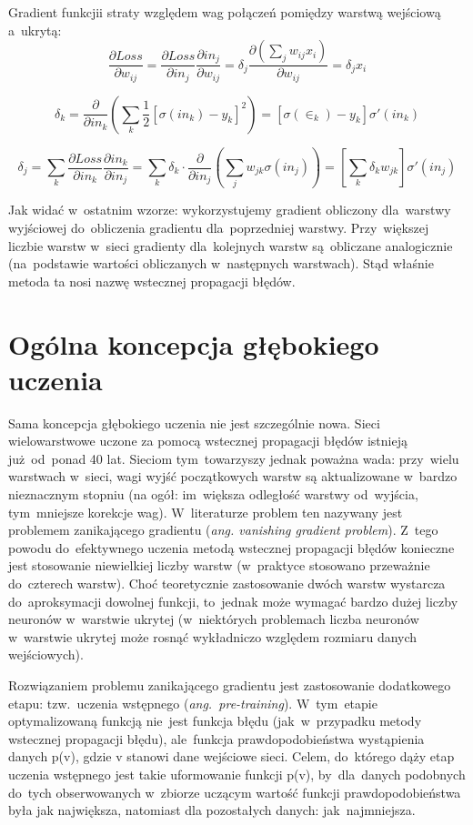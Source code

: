 Gradient funkcjii straty względem wag połączeń pomiędzy warstwą wejściową a~ukrytą:
$$ \frac{\partial Loss}{\partial w_{ij}}=\frac{\partial Loss}{\partial in_j}\frac{\partial in_j}{\partial
w_{ij}} = \delta_j \frac{\partial (\sum\limits_j w_{ij}x_i)}{\partial w_{ij}} = \delta_j x_i $$

$$ \delta_k = \frac{\partial}{\partial in_k}(\sum\limits_k \frac{1}{2}
[\sigma(in_k)-y_k]^2)=[\sigma(\in_k)-y_k]\sigma'(in_k)$$

$$ \delta_j = \sum\limits_k\frac{\partial Loss}{\partial in_k}\frac{\partial in_k}{\partial
in_j}=\sum\limits_k \delta_k \cdot \frac{\partial}{\partial in_j}(\sum\limits_j w_{jk}\sigma(in_j))=[\sum\limits_k \delta_k
w_{jk}]\sigma'(in_j)$$

Jak widać w~ostatnim wzorze: wykorzystujemy gradient obliczony dla~warstwy wyjściowej
do~obliczenia gradientu dla~poprzedniej warstwy. Przy~większej liczbie warstw w~sieci gradienty
dla~kolejnych warstw są~obliczane analogicznie (na~podstawie wartości obliczanych w~następnych warstwach).
Stąd właśnie metoda ta nosi nazwę wstecznej propagacji błędów.


\section{Ogólna koncepcja głębokiego uczenia}
Sama koncepcja głębokiego uczenia nie jest szczególnie nowa. Sieci
wielowarstwowe uczone za pomocą wstecznej propagacji błędów istnieją
już~od~ponad 40 lat. Sieciom tym~towarzyszy jednak poważna wada: przy~wielu
warstwach w~sieci, wagi wyjść początkowych warstw są aktualizowane w~bardzo
nieznacznym stopniu (na ogół: im~większa odległość warstwy od~wyjścia,
tym~mniejsze korekcje wag). W~literaturze problem ten nazywany jest problemem
zanikającego gradientu (\textit{ang. vanishing gradient problem}). Z~tego
powodu do~efektywnego uczenia metodą wstecznej propagacji błędów konieczne jest
stosowanie niewielkiej liczby warstw (w~praktyce stosowano przeważnie
do~czterech warstw). Choć teoretycznie zastosowanie dwóch warstw
wystarcza do~aproksymacji dowolnej funkcji, to~jednak może wymagać bardzo dużej
liczby neuronów w~warstwie ukrytej (w~niektórych problemach liczba neuronów w~warstwie ukrytej może rosnąć
wykładniczo względem rozmiaru danych wejściowych).

Rozwiązaniem problemu zanikającego gradientu jest zastosowanie dodatkowego
etapu: tzw.~uczenia wstępnego (\textit{ang.~pre-training}). W~tym~etapie
optymalizowaną funkcją nie~jest funkcja błędu (jak~w~przypadku metody wstecznej
propagacji błędu), ale~funkcja prawdopodobieństwa wystąpienia danych p(v),
gdzie v stanowi dane wejściowe sieci. Celem, do~którego dąży etap uczenia
wstępnego jest takie uformowanie funkcji p(v), by~dla~danych podobnych do~tych obserwowanych w~zbiorze
uczącym wartość funkcji prawdopodobieństwa była jak największa, natomiast dla pozostałych danych:
jak~najmniejsza.

